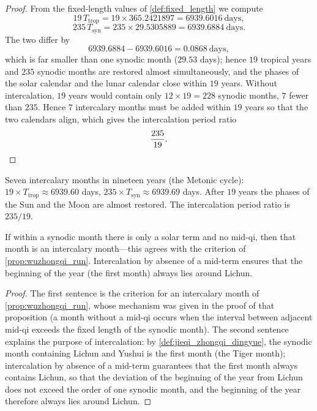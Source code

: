 \begin{proof}
From the fixed-length values of \cref{def:fixed_length} we compute
\[
19\,T_{\text{trop}}=19\times 365.2421897=6939.6016\ \text{days},
\]
\[
235\,T_{\text{syn}}=235\times 29.5305889=6939.6884\ \text{days}.
\]
The two differ by
\[
6939.6884-6939.6016=0.0868\ \text{days},
\]
which is far smaller than one synodic month (\(29.53\) days); hence \(19\) tropical years and \(235\) synodic months are restored almost simultaneously, and the phases of the solar calendar and the lunar calendar close within \(19\) years.
Without intercalation, \(19\) years would contain only \(12\times 19=228\) synodic months, \(7\) fewer than \(235\). Hence \(7\) intercalary months must be added within \(19\) years so that the two calendars align, which gives the intercalation period ratio
\[
\frac{235}{19}.
\qedhere
\]
\end{proof}

\begin{definition}\label{def:intercalation}
Seven intercalary months in nineteen years (the Metonic cycle): \(19\times T_{\text{trop}}\approx 6939.60\) days, \(235\times T_{\text{syn}}\approx 6939.69\) days. After \(19\) years the phases of the Sun and the Moon are almost restored. The intercalation period ratio is \(235/19\).
\end{definition}

\begin{proposition}\label{prop:wuzhongqi_rule}
If within a synodic month there is only a solar term and no mid-qi, then that month is an intercalary month---this agrees with the criterion of \cref{prop:wuzhongqi_run}. Intercalation by absence of a mid-term ensures that the beginning of the year (the first month) always lies around Lichun.
\end{proposition}

\begin{proof}
The first sentence is the criterion for an intercalary month of \cref{prop:wuzhongqi_run}, whose mechanism was given in the proof of that proposition (a month without a mid-qi occurs when the interval between adjacent mid-qi exceeds the fixed length of the synodic month). The second sentence explains the purpose of intercalation: by \cref{def:jieqi_zhongqi_dingyue}, the synodic month containing Lichun and Yushui is the first month (the Tiger month); intercalation by absence of a mid-term guarantees that the first month always contains Lichun, so that the deviation of the beginning of the year from Lichun does not exceed the order of one synodic month, and the beginning of the year therefore always lies around Lichun.
\end{proof}

